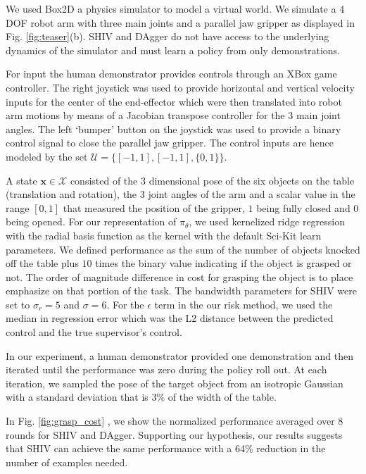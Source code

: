 \documentclass[10pt, conference]{ieeeconf}      %
\newcommand{\bx}{\mathbf{x}}
\begin{document}
We used Box2D a physics simulator to model a virtual world. We simulate a 4 DOF robot arm with three main joints and a parallel jaw gripper as
displayed in Fig. \ref{fig:teaser}(b). SHIV and DAgger do not have access to the underlying dynamics of the simulator and must learn a policy from only demonstrations. 

For input the human demonstrator provides controls through an XBox game controller. The right joystick was used to
    provide horizontal and vertical velocity inputs for the center of the end-effector which were then translated into
robot arm motions by means of a Jacobian transpose controller for the 3 main joint angles. The left `bumper' button on the joystick was used to provide a binary control signal to close the parallel jaw
gripper. The control inputs are hence modeled by the set $\mathcal{U} = \lbrace [-1,1],[-1,1],\lbrace 0,1 \rbrace \rbrace$.  

A state $\bx\in \mathcal{X}$ consisted of the 3 dimensional pose of the six objects on the table (translation and rotation), the 3 joint angles of the arm and a scalar value in the range $[0,1]$ that measured the position of the gripper, $1$ being fully closed and $0$ being opened. For our representation of $\pi_{\theta}$, we used kernelized ridge regression with the radial basis function as the kernel with the default Sci-Kit learn parameters. We defined performance as the sum of the number of objects knocked off the table plus $10$ times the binary value indicating if the object is grasped or not. The order of magnitude difference in cost for grasping the object is to place emphasize on that portion of the task. The bandwidth parameters for SHIV were set to $\sigma_r = 5$ and $\sigma = 6$. For the $\epsilon$ term in the our risk method, we used the median in regression error which was the L2 distance between the predicted control and the true supervisor's control. 

In our experiment, a human demonstrator provided one demonstration and then iterated until the performance was zero during the policy roll out. At each iteration, we sampled the pose of the target object from an isotropic Gaussian with a standard deviation that is  $3\%$ of the width of the table. 

 In Fig. \ref{fig:grasp_cost} , we show the normalized performance averaged over 8 rounds for SHIV and DAgger. Supporting our hypothesis, our results suggests that SHIV can achieve the same performance with a 64\% reduction in the number of examples needed.
\end{document}
